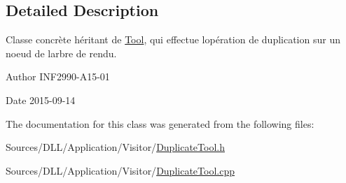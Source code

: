 \subsection{Detailed Description}
Classe concrète héritant de \hyperlink{class_tool}{Tool}, qui effectue l\textquotesingle{}opération de duplication sur un noeud de l\textquotesingle{}arbre de rendu. 

\begin{DoxyAuthor}{Author}
I\+N\+F2990-\/\+A15-\/01 
\end{DoxyAuthor}
\begin{DoxyDate}{Date}
2015-\/09-\/14 
\end{DoxyDate}


The documentation for this class was generated from the following files\+:\begin{DoxyCompactItemize}
\item 
Sources/\+D\+L\+L/\+Application/\+Visitor/\hyperlink{_duplicate_tool_8h}{Duplicate\+Tool.\+h}\item 
Sources/\+D\+L\+L/\+Application/\+Visitor/\hyperlink{_duplicate_tool_8cpp}{Duplicate\+Tool.\+cpp}\end{DoxyCompactItemize}
